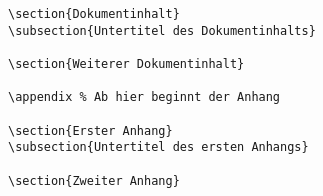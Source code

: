 \begin{lstlisting}[frame=tb, caption=Dokumentstruktur mit Anhang]
\section{Dokumentinhalt}
\subsection{Untertitel des Dokumentinhalts}

\section{Weiterer Dokumentinhalt}

\appendix % Ab hier beginnt der Anhang

\section{Erster Anhang}
\subsection{Untertitel des ersten Anhangs}

\section{Zweiter Anhang}

\end{lstlisting}


